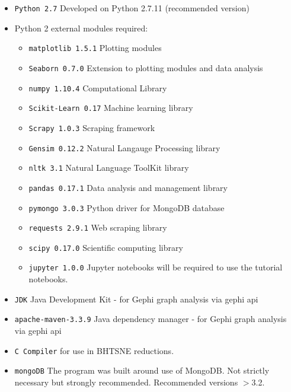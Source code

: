 \begin{itemize}
\itemsep-.6em
\item \texttt{Python 2.7} Developed on Python 2.7.11 (recommended version)
\item Python 2 external modules required:
	\begin{itemize}
	\itemsep-.6em
	\item \texttt{matplotlib 1.5.1} Plotting modules \cite{matplotlib}
	\item \texttt{Seaborn 0.7.0} Extension to plotting modules and data analysis \cite{seaborn}
    \item \texttt{numpy 1.10.4} Computational Library	 \cite{numpy}
	\item \texttt{Scikit-Learn 0.17} Machine learning library \cite{scikitlearn}
	\item \texttt{Scrapy 1.0.3} Scraping framework
	\item \texttt{Gensim 0.12.2} Natural Langauge Processing library \cite{gensim}
	\item \texttt{nltk 3.1} Natural Language ToolKit library \cite{nltk}
	\item \texttt{pandas 0.17.1} Data analysis and management library \cite{pandas}
	\item \texttt{pymongo 3.0.3} Python driver for MongoDB database 
    \item \texttt{requests 2.9.1} Web scraping library 
    \item \texttt{scipy 0.17.0} Scientific computing library \cite{scipy}
	\item \texttt{jupyter 1.0.0} Jupyter notebooks will be required to use the tutorial notebooks\cite{jupyter}.
    \end{itemize}
\item \texttt{JDK} Java Development Kit - for Gephi graph analysis via gephi api
\item \texttt{apache-maven-3.3.9} Java dependency manager - for Gephi graph analysis via gephi api
\item \texttt{C Compiler} for use in BHTSNE reductions\cite{bhtsne}.
\item \texttt{mongoDB} The program was built around use of MongoDB. Not strictly necessary but strongly recommended. Recommended versions $>$3.2.
\end{itemize}  
